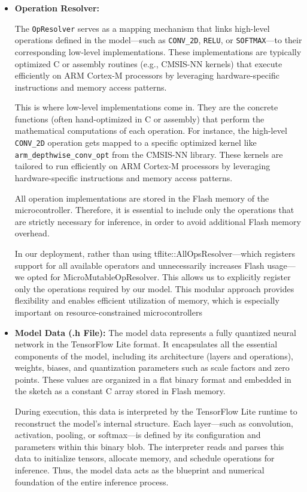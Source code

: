 \begin{itemize}
  \item \textbf{Operation Resolver:} 
    {\sloppy
    The \texttt{OpResolver} serves as a mapping mechanism that links high-level operations defined in the model—such as \texttt{CONV\_2D}, \texttt{RELU}, or \texttt{SOFTMAX}—to their corresponding low-level implementations. These implementations are typically optimized C or assembly routines (e.g., CMSIS-NN kernels) that execute efficiently on ARM Cortex-M processors by leveraging hardware-specific instructions and memory access patterns.
    \par}


    This is where low-level implementations come in. They are the concrete functions (often hand-optimized in C or assembly) that perform the mathematical computations of each operation. For instance, the high-level \texttt{CONV\_2D} operation gets mapped to a specific optimized kernel like \texttt{arm\_depthwise\_conv\_opt} from the CMSIS-NN library. These kernels are tailored to run efficiently on ARM Cortex-M processors by leveraging hardware-specific instructions and memory access patterns.

    All operation implementations are stored in the Flash memory of the microcontroller. Therefore, it is essential to include only the operations that are strictly necessary for inference, in order to avoid additional Flash memory overhead.

    In our deployment, rather than using tflite::AllOpsResolver—which registers support for all available operators and unnecessarily increases Flash usage—we opted for MicroMutableOpResolver. This allows us to explicitly register only the operations required by our model. This modular approach provides flexibility and enables efficient utilization of memory, which is especially important on resource-constrained microcontrollers
    
    \item \textbf{Model Data (.h File):} 
    The model data represents a fully quantized neural network in the TensorFlow Lite format. It encapsulates all the essential components of the model, including its architecture (layers and operations), weights, biases, and quantization parameters such as scale factors and zero points. These values are organized in a flat binary format and embedded in the sketch as a constant C array stored in Flash memory.
    
    During execution, this data is interpreted by the TensorFlow Lite runtime to reconstruct the model's internal structure. Each layer—such as convolution, activation, pooling, or softmax—is defined by its configuration and parameters within this binary blob. The interpreter reads and parses this data to initialize tensors, allocate memory, and schedule operations for inference. Thus, the model data acts as the blueprint and numerical foundation of the entire inference process.


\end{itemize}
